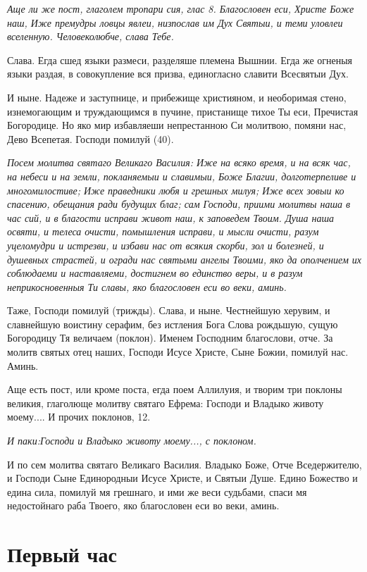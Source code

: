 \itshape Аще ли же пост, глаголем тропари сия, глас 8.\normalfont{} Благословен еси, Христе Боже наш, Иже премудры ловцы явлеи, низпослав им Дух Святыи, и теми уловлеи вселенную. Человеколюбче, слава Тебе.

Слава. Егда сшед языки размеси, разделяше племена Вышнии. Егда же огненыя языки раздая, в совокупление вся призва, единогласно славити Всесвятыи Дух.

И ныне. Надеже и заступнице, и прибежище християном, и необоримая стено, изнемогающим и труждающимся в пучине, пристанище тихое Ты еси, Пречистая Богородице. Но яко мир избавляеши непрестанною Си молитвою, помяни нас, Дево Всепетая. Господи помилуй (40).


\itshape Посем молитва святаго Великаго Василия:\normalfont{} Иже на всяко время, и на всяк час, на небеси и на земли, покланяемыи и славимыи, Боже Благии, долготерпеливе и многомилостиве; Иже праведники любя и грешных милуя; Иже всех зовыи ко спасению, обещания ради будущих благ; сам Господи, приими молитвы наша в час сий, и в благости исправи живот наш, к заповедем Твоим. Душа наша освяти, и телеса очисти, помышления исправи, и мысли очисти, разум уцеломудри и истрезви, и избави нас от всякия скорби, зол и болезней, и душевных страстей, и огради нас святыми ангелы Твоими, яко да ополчением их соблюдаеми и наставляеми, достигнем во единство веры, и в разум неприкосновенныя Ти славы, яко благословен еси во веки, аминь. 

Таже, Господи помилуй (трижды). Слава, и ныне. Честнейшую херувим, и славнейшую воистину серафим, без истления Бога Слова рождьшую, сущую Богородицу Тя величаем (поклон). Именем Господним благослови, отче. За молитв святых отец наших, Господи Исусе Христе, Сыне Божии, помилуй нас. Аминь.


Аще есть пост, или кроме поста, егда поем Аллилуия, и творим три поклоны великия, глаголюще молитву святаго Ефрема: Господи и Владыко животу моему.... И прочих поклонов, 12.


\itshape И паки:\normalfont{}Господи и Владыко животу моему..., с поклоном. 

И по сем молитва святаго Великаго Василия. Владыко Боже, Отче Вседержителю, и Господи Сыне Единородныи Исусе Христе, и Святыи Душе. Едино Божество и едина сила, помилуй мя грешнаго, и ими же веси судьбами, спаси мя недостойнаго раба Твоего, яко благословен еси во веки, аминь.


\section{Первый час}
 


